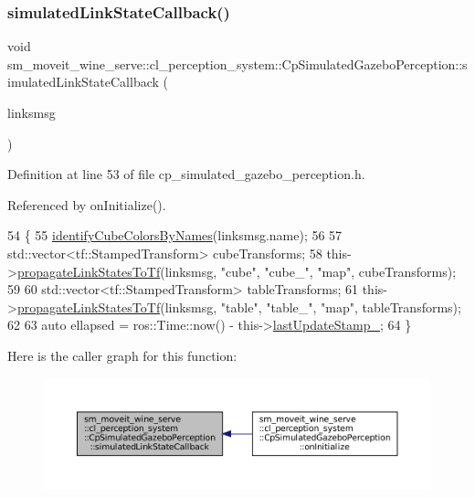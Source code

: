 \subsubsection{\texorpdfstring{simulated\+Link\+State\+Callback()}{simulatedLinkStateCallback()}}
{\footnotesize\ttfamily void sm\+\_\+moveit\+\_\+wine\+\_\+serve\+::cl\+\_\+perception\+\_\+system\+::\+Cp\+Simulated\+Gazebo\+Perception\+::simulated\+Link\+State\+Callback (\begin{DoxyParamCaption}\item[{const gazebo\+\_\+msgs\+::\+Link\+States \&}]{linksmsg }\end{DoxyParamCaption})\hspace{0.3cm}{\ttfamily [inline]}}



Definition at line 53 of file cp\+\_\+simulated\+\_\+gazebo\+\_\+perception.\+h.



Referenced by on\+Initialize().


\begin{DoxyCode}
54             \{
55                 \hyperlink{classsm__moveit__wine__serve_1_1cl__perception__system_1_1CpSimulatedGazeboPerception_a0a6d37ab728b459d96322cb4ef734f2a}{identifyCubeColorsByNames}(linksmsg.name);
56 
57                 std::vector<tf::StampedTransform> cubeTransforms;
58                 this->\hyperlink{classsm__moveit__wine__serve_1_1cl__perception__system_1_1CpSimulatedGazeboPerception_ad5ba42ed951b2a1bd36c9eb13f9696e9}{propagateLinkStatesToTf}(linksmsg, \textcolor{stringliteral}{"cube"}, \textcolor{stringliteral}{"cube\_"}, \textcolor{stringliteral}{"map"}, 
      cubeTransforms);
59 
60                 std::vector<tf::StampedTransform> tableTransforms;
61                 this->\hyperlink{classsm__moveit__wine__serve_1_1cl__perception__system_1_1CpSimulatedGazeboPerception_ad5ba42ed951b2a1bd36c9eb13f9696e9}{propagateLinkStatesToTf}(linksmsg, \textcolor{stringliteral}{"table"}, \textcolor{stringliteral}{"table\_"}, \textcolor{stringliteral}{"map"}, 
      tableTransforms);
62 
63                 \textcolor{keyword}{auto} ellapsed = ros::Time::now() - this->\hyperlink{classsm__moveit__wine__serve_1_1cl__perception__system_1_1CpSimulatedGazeboPerception_af2356284eba453862b722899b9f3fd0f}{lastUpdateStamp\_};
64             \}
\end{DoxyCode}
Here is the caller graph for this function\+:
\nopagebreak
\begin{figure}[H]
\begin{center}
\leavevmode
\includegraphics[width=350pt]{classsm__moveit__wine__serve_1_1cl__perception__system_1_1CpSimulatedGazeboPerception_a38e80c3c39a9cc20ddca22f9c5c5355b_icgraph}
\end{center}
\end{figure}


